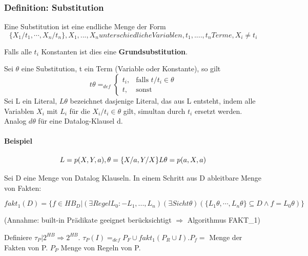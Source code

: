\documentclass[12pt, a4paper]{article}
\begin{document}
\subsubsection*{Definition: Substitution}
Eine Substitution ist eine endliche Menge der Form
\begin{equation}
\{ X_1 / t_1, \cdots, X_n / t_n \}, X_1,...,X_n unterschiedliche Variablen, t_1,....,t_n Terme, X_i \neq t_i
\end{equation}

Falls alle $t_i$ Konstanten ist dies eine \textbf{Grundsubstitution}.

Sei $\theta$ eine Substitution, t ein Term (Variable oder Konstante), so gilt \\

\begin{equation}
t\theta =_{def} \begin{cases} t_i, & \mbox{falls } t/t_i \in \theta \\ t, & \mbox{sonst} \end{cases}
\end{equation}
Sei L ein Literal, $L\theta$ bezeichnet dasjenige Literal, das aus L entsteht, indem alle Variablen $X_i$ mit $L_i$ für die $X_i / t_i \in \theta$ gilt, simultan durch $t_i$ ersetzt werden. Analog $d\theta$ für eine Datalog-Klausel d.

\paragraph{Beispiel}

\begin{equation}
L = p(X, Y, a), \theta = \{X / a, Y / X \} \\
L\theta = p(a, X, a)
\end{equation}

Sei D eine Menge von Datalog Klauseln. In einem Schritt aus D ableitbare Menge von Fakten:

\begin{equation}
fakt_1(D) = \{ f \in HB_D | (\exists Regel L_0 :- L_1,...,L_n)(\exists Sicht \theta)(\{ L_1 \theta, \cdots, L_n\theta \} \subseteq D \wedge f = L_0\theta) \}
\end{equation}

(Annahme: built-in Prädikate geeignet berücksichtigt $\Rightarrow$ Algorithmus FAKT\_1)

Definiere $\tau_P | 2^{HB} \Rightarrow 2^{HB}$. $\tau_P(I) =_{def} P_F \cup fakt_1(P_R \cup I)$.$ P_f = $ Menge der Fakten von P. $P_P$ Menge von Regeln von P.
\end{document}
